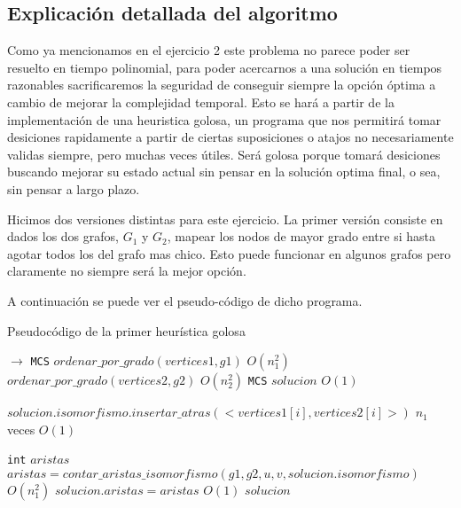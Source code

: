 \subsection{Explicación detallada del algoritmo}

Como ya mencionamos en el ejercicio 2 este problema no parece poder ser resuelto en tiempo polinomial, para poder acercarnos a una solución en tiempos razonables sacrificaremos la seguridad de conseguir siempre la opción óptima a cambio de mejorar la complejidad temporal. Esto se hará a partir de la implementación de una heuristica golosa, un programa que nos permitirá tomar desiciones rapidamente a partir de ciertas suposiciones o atajos no necesariamente validas siempre, pero muchas veces útiles. Será golosa porque tomará desiciones buscando mejorar su estado actual sin pensar en la solución optima final, o sea, sin pensar a largo plazo.

Hicimos dos versiones distintas para este ejercicio. La primer versión consiste en dados los dos grafos, $G_1$ y $G_2$, mapear los nodos de mayor grado entre si hasta agotar todos los del grafo mas chico. Esto puede funcionar en algunos grafos pero claramente no siempre será la mejor opción. 

A continuación se puede ver el pseudo-código de dicho programa.

\begin{algorithm}[H]
  \begin{algorithmic}[1]
  \caption{Pseudocódigo de la primer heurística golosa}
  \label{algo:4-1}
     $\to$ \texttt{MCS}
      \State $ordenar\_por\_grado(vertices1, g1)$ 
        \Comment $O(n_1^2)$ 
      \State $ordenar\_por\_grado(vertices2, g2)$ 
        \Comment $O(n_2^2)$ 
      \State \texttt{MCS} $solucion$ 
        \Comment $O(1)$ 

	  \State  $solucion.isomorfismo.insertar\_atras(<vertices1[i],vertices2[i]>)$
      \Comment $n_1$ veces $O(1)$
    	  \EndFor

	  \State \texttt{int} $aristas$
	  \State $ aristas = contar\_aristas\_isomorfismo(g1,g2,u,v, solucion.isomorfismo)$
      \Comment $O(n_1^2)$
	  \State $solucion.aristas = aristas$
	  \Comment $O(1)$
      \State \Return $solucion$
      \EndProcedure
	\end{algorithmic}
\end{algorithm}

